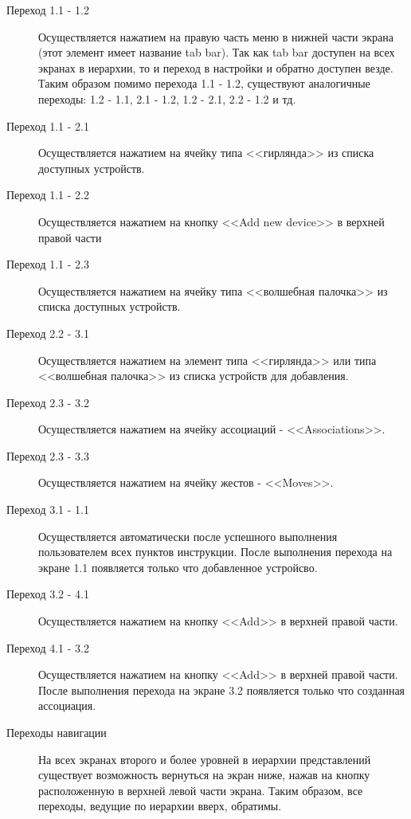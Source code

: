   \begin{description}
  \item [Переход 1.1 - 1.2] Осуществляется нажатием на правую часть меню в нижней части экрана (этот элемент имеет название tab bar). Так как tab bar доступен на всех экранах в иерархии, то и переход в настройки и обратно доступен везде. Таким образом помимо перехода 1.1 - 1.2, существуют аналогичные переходы: 1.2 - 1.1, 2.1 - 1.2, 1.2 - 2.1, 2.2 - 1.2 и тд. 
  \item [Переход 1.1 - 2.1] Осуществляется нажатием на ячейку типа <<гирлянда>> из списка доступных устройств.
  \item [Переход 1.1 - 2.2] Осуществляется нажатием на кнопку <<Add new device>> в верхней правой части
  \item [Переход 1.1 - 2.3] Осуществляется нажатием на ячейку типа <<волшебная палочка>> из списка доступных устройств.
  \item [Переход 2.2 - 3.1] Осуществляется нажатием на элемент типа <<гирлянда>> или типа <<волшебная палочка>> из списка устройств для добавления.
  \item [Переход 2.3 - 3.2] Осуществляется нажатием на ячейку ассоциаций - <<Associations>>.
  \item [Переход 2.3 - 3.3] Осуществляется нажатием на ячейку жестов - <<Moves>>.
  \item [Переход 3.1 - 1.1] Осуществляется автоматически после успешного выполнения пользователем всех пунктов инструкции. После выполнения перехода на экране 1.1 появляется только что добавленное устройсво.
  \item [Переход 3.2 - 4.1] Осуществляется нажатием на кнопку <<Add>> в верхней правой части.
  \item [Переход 4.1 - 3.2] Осуществляется нажатием на кнопку <<Add>> в верхней правой части. После выполнения перехода на экране 3.2 появляется только что созданная ассоциация.
  \item [Переходы навигации] На всех экранах второго и более уровней в иерархии представлений существует возможность вернуться на экран ниже, нажав на кнопку расположенную в верхней левой части экрана. Таким образом, все переходы, ведущие по иерархии вверх, обратимы. 
 \end{description}
